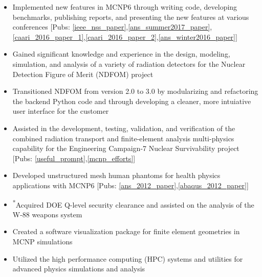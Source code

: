 \begin{center}
	\begin{minipage}{\textwidth}
	\begin{itemize}
	    \item Implemented new features in \textsc{MCNP6} through writing code, developing benchmarks, publishing reports, 
		    and presenting the new features at various conferences [Pubs: \ref{ieee_nss_paper},\ref{ans_summer2017_paper},\ref{caari_2016_paper_1},\ref{caari_2016_paper_2},\ref{ans_winter2016_paper}] 
	    \item Gained significant knowledge and experience in the design, modeling, simulation, and analysis 
		    of a variety of radiation detectors for the Nuclear Detection Figure of Merit (NDFOM) project
	    \item Transitioned NDFOM from version 2.0 to 3.0 by modularizing and refactoring the backend 
		   Python code and through developing a cleaner, more intuiative user interface for the customer
	    \item Assisted in the development, testing, validation, and verification of the combined radiation transport and 
		    finite-element analysis multi-physics capability for the Engineering Campaign-7 Nuclear Survivability project [Pubs: \ref{useful_prompt},\ref{mcnp_efforts}]
	    \item Developed unstructured mesh human phantoms for health physics applications with \textsc{MCNP6} [Pubs: \ref{ans_2012_paper},\ref{abaqus_2012_paper}]
	    \item \textsuperscript{*}Acquired DOE Q-level security clearance and assisted on the analysis of the W-88 weapons system
	    \item Created a software visualization package for finite element geometries in MCNP simulations
	    \item Utilized the high performance computing (HPC) systems and utilities for advanced physics simulations and analysis

\end{itemize}
\end{minipage}
\end{center}
